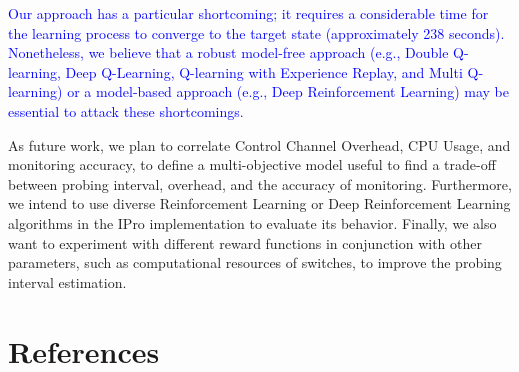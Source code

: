 \textcolor{blue}{Our approach has a particular shortcoming; it requires a considerable time for the learning process to converge to the target state (approximately 238 seconds). Nonetheless,  we believe that a robust model-free approach (e.g., Double Q-learning, Deep Q-Learning, Q-learning with Experience Replay, and Multi Q-learning) or a model-based approach (e.g., Deep Reinforcement Learning) may be essential to attack these shortcomings.}

As future work, we plan to correlate Control Channel Overhead, CPU Usage, and monitoring accuracy, to define a multi-objective model useful to find a trade-off between probing interval, overhead, and the accuracy of monitoring. Furthermore, we intend to use diverse Reinforcement Learning or Deep Reinforcement Learning algorithms in the IPro implementation to evaluate its behavior. Finally, we also want to experiment with different reward functions in conjunction with other parameters, such as computational resources of switches, to improve the probing interval estimation.




\section*{References}


